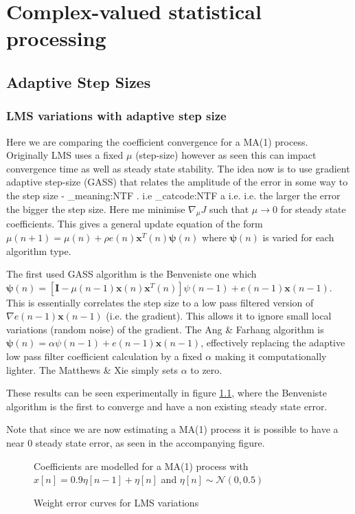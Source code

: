 \documentclass[10pt,twoside,a4paper]{report}
\makeatletter
\newcommand\latinabbrev[1]{
  \peek_meaning:NTF . {%
    #1\@}%
  { \peek_catcode:NTF a {%
      #1.\@ }%
    {#1.\@}}}
\makeatother
\begin{document}
\clearpage
\newpage

\chapter{Complex-valued statistical processing}

\section{Adaptive Step Sizes}
\subsection{LMS variations with adaptive step size}
Here we are comparing the coefficient convergence for a MA(1) process. Originally LMS uses a fixed $\mu$ (step-size) however as seen this can impact convergence time as well as steady state stability. The idea now is to use gradient adaptive step-size (GASS)  that relates the amplitude of the error in some way to the step size - \latinabbrev{i.e} the larger the error the bigger the step size. Here me minimise $\nabla_\mu J$ such that $\mu \to 0$ for steady state coefficients. This gives a general update equation of the form $\mu(n+1)=\mu(n)+\rho e(n) \mathbf{x}^T(n)\bm{\psi}(n)$ where $\bm{\psi}(n)$ is varied for each algorithm type.

The first used GASS algorithm is the Benveniste one which $\bm{\psi}(n) = [\mathbf{I}-\mu(n-1)\mathbf{x}(n)\mathbf{x}^T(n)]\psi(n-1)+e(n-1)\mathbf{x}(n-1)$. This is essentially correlates the step size to a low pass filtered version of $\nabla e(n-1)\mathbf{x}(n-1)$ (i.e. the gradient). This allows it to ignore small local variations (random noise) of the gradient. The Ang \& Farhang algorithm is $\bm{\psi}(n) = \alpha\psi(n-1)+e(n-1)\mathbf{x}(n-1)$, effectively replacing the adaptive low pass filter coefficient calculation by a fixed $\alpha$ making it computationally lighter. The Matthews \& Xie simply sets $\alpha$ to zero.

These results can be seen experimentally in figure \ref{fig:4_1a}, where the Benveniste algorithm is the first to converge and have a non existing steady state error. 

Note that since we are now estimating a MA(1) process it is possible to have a near 0 steady state error, as seen in the accompanying figure.




\begin{figure}[h]
\centering
\resizebox{\textwidth}{!}{}
Coefficients are modelled for a MA(1) process with $x[n]=0.9\eta[n-1]+\eta[n]$ and $\eta[n] \sim \mathcal{N}(0,0.5)$
\caption{Weight error curves for LMS variations}
\label{fig:4_1a}
\end{figure}
\end{document}
